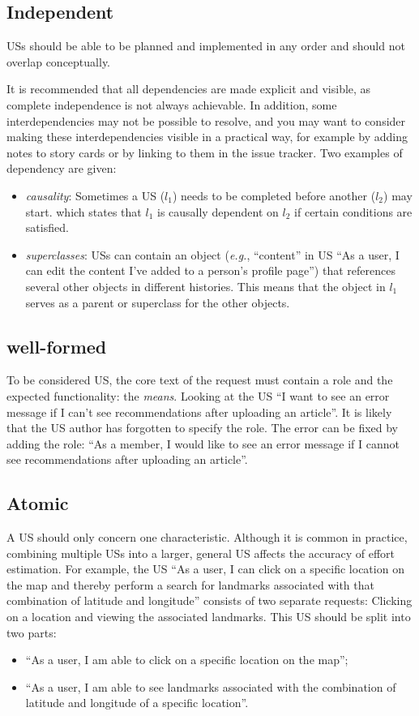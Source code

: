 \subsection*{\normalsize{Independent}}
USs should be able to be planned and implemented in any order and should not overlap conceptually. 

It is recommended that all dependencies are made explicit and visible, as complete independence is not always achievable. In addition, some interdependencies may not be possible to resolve, and you may want to consider making these interdependencies visible in a practical way, for example by adding notes to story cards or by linking to them in the issue tracker. Two examples of dependency are given:
\begin{itemize}
\item\emph{causality}: Sometimes a US ($l_1$) needs to be completed before another ($l_2$) may start. which states that $l_1$ is causally dependent on $l_2$ if certain conditions are satisfied.
\item\emph{superclasses}: USs can contain an object (\emph{e.g.}, \enquote{content} in US \enquote{As a user, I can edit the content I've added to a person's profile page}) that references several other objects in different histories. This means that the object in $l_1$ serves as a parent or superclass for the other objects.
\end{itemize}
\subsection*{\normalsize{well-formed}}
To be considered US, the core text of the request must contain a role and the expected functionality: the \emph{means}. Looking at the US \enquote{I want to see an error message if I can't see recommendations after uploading an article}. It is likely that the US author has forgotten to specify the role. The error can be fixed by adding the role: \enquote{As a member, I would like to see an error message if I cannot see recommendations after uploading an article}.
\subsection*{\normalsize{Atomic}}
A US should only concern one characteristic. Although it is common in practice, combining multiple USs into a larger, general US affects the accuracy of effort estimation\cite{liskin2014we}. For example, the US \enquote{As a user, I can click on a specific location on the map and thereby perform a search for landmarks associated with that combination of latitude and longitude} consists of two separate requests: Clicking on a location and viewing the associated landmarks. This US should be split into two parts:
\begin{itemize}
\item  \enquote{As a user, I am able to click on a specific location on the map};
\item  \enquote{As a user, I am able to see landmarks associated with the combination of latitude and longitude of a specific location}.
\end{itemize}
